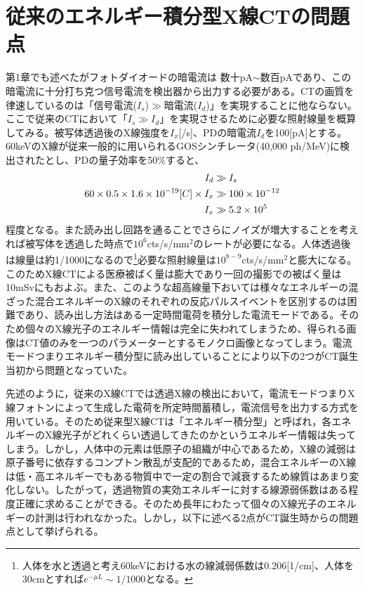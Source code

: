 \section{従来のエネルギー積分型X線CTの問題点\label{sec:problem}}

第1章でも述べたがフォトダイオードの暗電流は 数十pA$\sim$数百pAであり、この暗電流に十分打ち克つ信号電流を検出器から出力する必要がある。CTの画質を律速しているのは「信号電流($I_s$)$\gg$暗電流($I_d$)」を実現することに他ならない。ここで従来のCTにおいて「$I_s\gg I_d$」を実現させるために必要な照射線量を概算してみる。被写体透過後のX線強度を$I_x$[/s]、PDの暗電流$I_d$を100[pA]とする。60keVのX線が従来一般的に用いられるGOSシンチレータ(40,000 ph/MeV)に検出されたとし、PDの量子効率を50\%すると、
\begin{align}
I_d&\gg I_s\\
60\time40\times0.5\times1.6\times10^{-19} [C] \times I_x&\gg100\times10^{-12}\\
I_x&\gg 5.2\times10^5
\end{align}
程度となる。また読み出し回路を通ることでさらにノイズが増大することを考えれば被写体を透過した時点で$10^{6}$cts/s/mm$^2$のレートが必要になる。人体透過後は線量は約1/1000になるので\footnote{人体を水と透過と考え60keVにおける水の線減弱係数は0.206[1/cm]、人体を30cmとすれば$e^{-\mu L}\sim1/1000$となる。}必要な照射線量は$10^{8-9}$cts/s/mm$^2$と膨大になる。このためX線CTによる医療被ばく量は膨大であり一回の撮影での被ばく量は10mSvにもおよぶ。また、このような超高線量下おいては様々なエネルギーの混ざった混合エネルギーのX線のそれぞれの反応パルスイベントを区別するのは困難であり、読み出し方法はある一定時間電荷を積分した電流モードである。そのため個々のX線光子のエネルギー情報は完全に失われてしまうため、得られる画像はCT値のみを一つのパラメーターとするモノクロ画像となってしまう。電流モードつまりエネルギー積分型に読み出していることにより以下の2つがCT誕生当初から問題となっていた。


先述のように，従来のX線CTでは透過X線の検出において，電流モードつまりX線フォトンによって生成した電荷を所定時間蓄積し，電流信号を出力する方式を用いている。そのため従来型X線CTは「エネルギー積分型」と呼ばれ，各エネルギーのX線光子がどれくらい透過してきたのかというエネルギー情報は失ってしまう。しかし，人体中の元素は低原子の組織が中心であるため，X線の減弱は原子番号に依存するコンプトン散乱が支配的であるため，混合エネルギーのX線は低・高エネルギーでもある物質中で一定の割合で減衰するため線質はあまり変化しない。したがって，透過物質の実効エネルギーに対する線源弱係数はある程度正確に求めることができる。そのため長年にわたって個々のX線光子のエネルギーの計測は行われなかった。しかし，以下に述べる2点がCT誕生時からの問題点として挙げられる。
\fi

